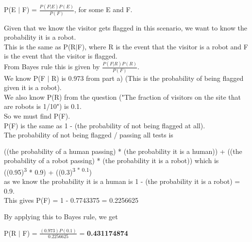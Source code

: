 \documentclass{report}
\begin{document}
					\begin{center}
						P(E $\vert$ F) = $\frac{P(F \vert E)P(E)}{P(F)}$, for some E and F.
					\end{center}
		
					Given that we know the visitor gets flagged in this scenario, we want to know the probability it is a robot.\\
					This is the same as P(R$\vert$F), where R is the event that the visitor is a robot and F is the event that the visitor is flagged.\\
					From Bayes rule this is given by $\frac{P(F \vert R)P(R)}{P(F)}$.\\
					We know P(F $\vert$ R) is 0.973 from part a) (This is the probability of being flagged given it is a robot).\\
					We also know P(R) from the question ("The fraction of visitors on the site that are robots is 1/10") is 0.1.\\
					So we must find P(F).\\
					P(F) is the same as 1 - (the probability of not being flagged at all).\\
					The probability of not being flagged / passing all tests is 
		
					\begin{center}
						((the probability of a human passing) * (the probability it is a human)) + ((the probability of a robot passing) * (the probability it is a robot)) which is \\
						((0.95)\textsuperscript{3} * 0.9) + ((0.3)\textsuperscript{3 * 0.1})\\
						as we know the probability it is a human is 1 - (the probability it is a robot) = 0.9.\\
						This gives P(F) = 1 - 0.7743375 = 0.2256625
					\end{center}
		
					By applying this to Bayes rule, we get 
		
					\begin{center}
						P(R $\vert$ F) = $\frac{(0.973)P(0.1)}{0.2256625}$ = \textbf{0.431174874}
		\end{center}
		
	
	
		
		
\end{document}

